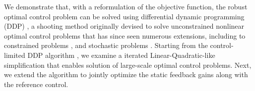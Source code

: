 We demonstrate that, with a reformulation of the objective function, the robust optimal control problem can be solved using differential dynamic programming (DDP) \cite{DDP}, a shooting method originally devised to solve unconstrained nonlinear optimal control problems that has since seen numerous extensions, including to constrained problems \cite{DDP_ControlLimited,HDDP1,HDDP2,DDP_NonlinearConstraints,DDP_InteriorPoint}, and stochastic problems \cite{iLQG, DDP_Stochastic, ozaki_UT,ozaki2020tube}. 
Starting from the control-limited DDP algorithm \cite{DDP_ControlLimited}, we examine a iterated Linear-Quadratic-like simplification \cite{iLQG} that enables solution of large-scale optimal control problems. Next, we extend the algorithm to jointly optimize the static feedback gains along with the reference control.



